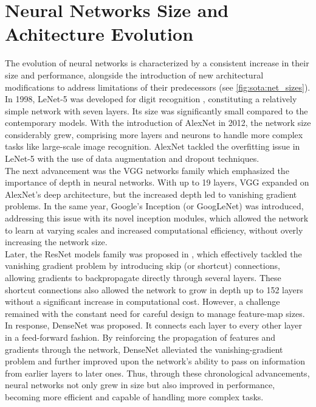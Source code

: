 \section{Neural Networks Size and Achitecture Evolution}\label{sec:sota:nn_evolution}

The evolution of neural networks is characterized by a consistent increase in
their size and performance, alongside the introduction of new architectural
modifications to address limitations of their predecessors (see
\cref{fig:sota:net_sizes}). In 1998, LeNet-5 was developed for digit recognition
\cite{DBLP:journals/pieee/LeCunBBH98}, constituting a relatively simple network
with seven layers. Its size was significantly small compared to the contemporary
models. With the introduction of AlexNet \cite{DBLP:conf/nips/KrizhevskySH12} in
2012, the network size considerably grew, comprising more layers and neurons to
handle more complex tasks like large-scale image recognition. AlexNet tackled
the overfitting issue in LeNet-5 with the use of data augmentation and dropout
techniques.\\


The next advancement was the VGG networks family
\cite{DBLP:journals/corr/SimonyanZ14a} %
which emphasized the importance of depth in neural networks. With up to 19
layers, VGG expanded on AlexNet's deep architecture, but the increased depth led
to vanishing gradient problems. In the same year, Google's Inception (or
GoogLeNet) \cite{DBLP:conf/cvpr/SzegedyLJSRAEVR15} was introduced, addressing
this issue with its novel inception modules, which allowed the network to learn
at varying scales and increased computational efficiency, without overly
increasing the network size.\\

Later, the ResNet models family was proposed in \cite{DBLP:conf/cvpr/HeZRS16},
which effectively tackled the vanishing gradient problem by introducing skip (or
shortcut) connections, allowing gradients to backpropagate directly through
several layers. These shortcut connections also allowed the network to grow in
depth up to 152 layers without a significant increase in computational cost.
However, a challenge remained with the constant need for careful design to
manage feature-map sizes.\\

In response, DenseNet \cite{huang2017densely} was proposed.%
It connects each layer to every other layer in a feed-forward fashion. By
reinforcing the propagation of features and gradients through the network,
DenseNet alleviated the vanishing-gradient problem and further improved upon the
network's ability to pass on information from earlier layers to later ones.
Thus, through these chronological advancements, neural networks not only grew in
size but also improved in performance, becoming more efficient and capable of
handling more complex tasks.

